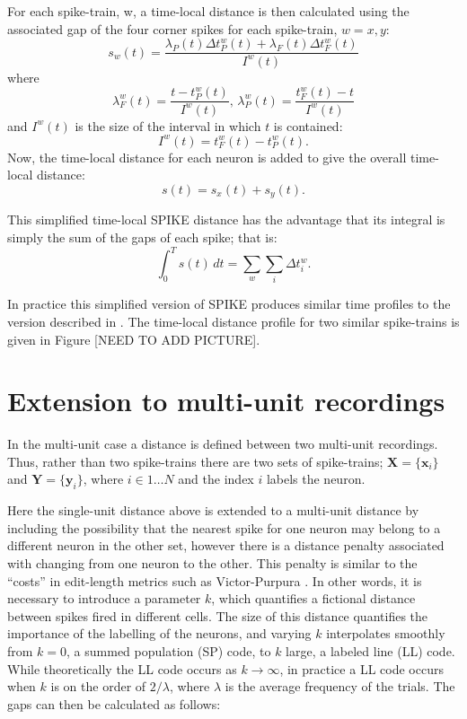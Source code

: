 For each spike-train, w, a time-local distance is then calculated using the associated gap of the four corner spikes for each spike-train, $w=x,y$:
\begin{equation}
s_w(t) = \frac{\lambda_P(t) \Delta t_P^w(t) + \lambda_F(t)\Delta t_F^w(t)}{I^w(t)}
\end{equation}
where
\begin{equation}
\lambda_F^w(t) = \frac{t- t_P^w(t)}{I^w(t)}, \, \lambda_P^w(t) = \frac{ t_F^w(t) - t}{I^w(t)}
\end{equation}
and $I^w(t)$ is the size of the interval in which $t$ is contained:
\begin{equation}
I^w(t) = t_F^w(t) - t_P^w(t).
\end{equation}
Now, the time-local distance for each neuron is added to give the overall time-local distance:
\begin{equation}
s(t) = s_x(t) + s_y(t).
\end{equation}

This simplified time-local SPIKE distance has the advantage that its integral is simply the sum of the gaps of each spike; that is:
\begin{equation}
\int_0^T s(t)\, dt = \sum_w \sum_i \Delta t_i^w.
\end{equation}

In practice this simplified version of SPIKE produces similar time profiles to the version described in \cite{Kreuzetal2011}. The time-local distance profile for two similar spike-trains is given in Figure [NEED TO ADD PICTURE].

\section{Extension to multi-unit recordings}

In the multi-unit case a distance is defined between two multi-unit recordings.  Thus, rather than two spike-trains there are two sets of spike-trains; $\mathbf{X}=\{ \mathbf{x}_i \}$ and $ \mathbf{Y}=\{ \mathbf{y}_i \}$, where $i \in 1\ldots N$ and the index $i$ labels the neuron.

Here the single-unit distance above is extended to a multi-unit distance by including the possibility that the nearest spike for one neuron may belong to a different neuron in the other set, however there is a distance penalty associated with changing from one neuron to the other. This penalty is similar to the ``costs'' in edit-length metrics such as Victor-Purpura \cite{VictorPurpura1997}. In other words, it is necessary to introduce a parameter $k$, which quantifies a fictional distance between spikes fired in different cells.  The size of this distance quantifies the importance of the labelling of the neurons, and varying $k$ interpolates smoothly from $k=0$, a summed population (SP) code, to $k$ large, a labeled line  (LL) code.  While theoretically the LL code occurs as $k \rightarrow \infty$, in practice a LL code occurs when $k$ is on the order of $2/\lambda$, where $\lambda$ is the average frequency of the trials.   The gaps can then be calculated as follows:

